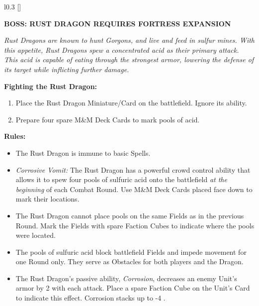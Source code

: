 \begin{wrapfigure}{l}{0.3\textwidth}
  \raisebox{0pt}[\dimexpr{}\baselineskip\relax]{}
\end{wrapfigure}
{
  \textbf{\MakeUppercase{Boss: Rust Dragon {\scriptsize Requires Fortress Expansion}}}

  \medskip

  \textit{Rust Dragons are known to hunt Gorgons, and live and feed in sulfur mines.
    With this appetite, Rust Dragons spew a concentrated acid as their primary attack.
    This acid is capable of eating through the strongest armor, lowering the defense of its target while inflicting further damage.
  }

  \medskip

  \textbf{Fighting the Rust Dragon:}
  \begin{enumerate}
    \item Place the Rust Dragon Miniature/Card on the battlefield.
      Ignore its ability.
    \item Prepare four spare M\&M Deck Cards to mark pools of acid.
  \end{enumerate}

  \medskip

  \textbf{Rules:}
  \begin{itemize}
    \item The Rust Dragon is immune to basic Spells.
    \item \textit{Corrosive Vomit:} The Rust Dragon has a powerful crowd control ability that allows it to spew four pools of sulfuric acid onto the battlefield \textit{at the beginning} of each Combat Round.
      Use M\&M Deck Cards placed face down to mark their locations.
    \item The Rust Dragon cannot place pools on the same Fields as in the previous Round.
      Mark the Fields with spare Faction Cubes to indicate where the pools were located.
    \item The pools of sulfuric acid block battlefield Fields and impede movement for one Round only.
      They serve as Obstacles for both players and the Dragon.
    \item The Rust Dragon's passive ability, \textit{Corrosion}, decreases an enemy Unit's armor by 2 with each attack.
      Place a spare Faction Cube on the Unit's Card to indicate this effect.
      Corrosion stacks up to -4 .
  \end{itemize}
}

